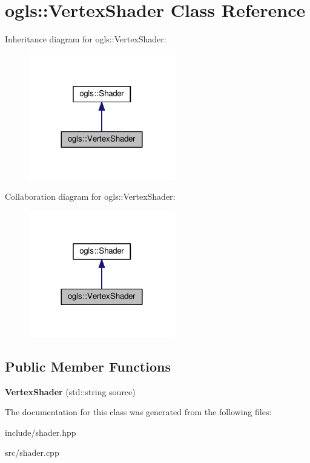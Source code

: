 \hypertarget{classogls_1_1VertexShader}{\section{ogls\-:\-:Vertex\-Shader Class Reference}
\label{classogls_1_1VertexShader}
}


Inheritance diagram for ogls\-:\-:Vertex\-Shader\-:\nopagebreak
\begin{figure}[H]
\begin{center}
\leavevmode
\includegraphics[width=180pt]{df/d56/classogls_1_1VertexShader__inherit__graph}
\end{center}
\end{figure}


Collaboration diagram for ogls\-:\-:Vertex\-Shader\-:\nopagebreak
\begin{figure}[H]
\begin{center}
\leavevmode
\includegraphics[width=180pt]{d3/d62/classogls_1_1VertexShader__coll__graph}
\end{center}
\end{figure}
\subsection*{Public Member Functions}
\begin{DoxyCompactItemize}
\item 
\hypertarget{classogls_1_1VertexShader_aed076b75f98fef94a264f3523a68c603}{{\bfseries Vertex\-Shader} (std\-::string source)}\label{classogls_1_1VertexShader_aed076b75f98fef94a264f3523a68c603}

\end{DoxyCompactItemize}


The documentation for this class was generated from the following files\-:\begin{DoxyCompactItemize}
\item 
include/shader.\-hpp\item 
src/shader.\-cpp\end{DoxyCompactItemize}
